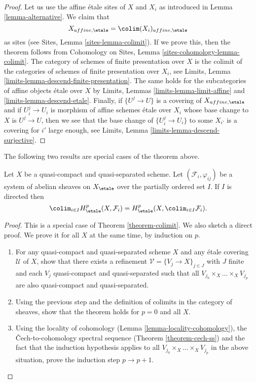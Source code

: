 \begin{proof}
Let us use the affine \'etale sites of $X$ and $X_i$ as introduced
in Lemma \ref{lemma-alternative}. We claim that
$$
X_{affine, \etale} = \colim (X_i)_{affine, \etale}
$$
as sites (see Sites, Lemma \ref{sites-lemma-colimit}).
If we prove this, then the theorem follows from
Cohomology on Sites, Lemma \ref{sites-cohomology-lemma-colimit}.
The category of schemes of finite presentation over $X$ is the
colimit of the categories of schemes of finite presentation over $X_i$, see
Limits, Lemma \ref{limits-lemma-descend-finite-presentation}.
The same holds for the subcategories of affine objects \'etale over
$X$ by Limits, Lemmas
\ref{limits-lemma-limit-affine} and \ref{limits-lemma-descend-etale}.
Finally, if $\{U^j \to U\}$ is a covering of $X_{affine, \etale}$
and if $U_i^j \to U_i$ is morphism of affine schemes \'etale over
$X_i$ whose base change to $X$ is $U^j \to U$, then we see that
the base change of $\{U^j_i \to U_i\}$ to some $X_{i'}$ is
a covering for $i'$ large enough, see
Limits, Lemma \ref{limits-lemma-descend-surjective}.
\end{proof}

\noindent
The following two results are special cases of the theorem above.

\begin{lemma}
\label{lemma-colimit}
Let $X$ be a quasi-compact and quasi-separated scheme. Let
$\left(\mathcal{F}_i, \varphi_{ij}\right)$ be a system of abelian sheaves on
$X_\etale$ over the partially ordered set $I$. If $I$ is directed then
$$
\colim_{i\in I} H_\etale^p(X, \mathcal{F}_i) = H_\etale^p(X,
\colim_{i\in I} \mathcal{F}_i).
$$
\end{lemma}

\begin{proof}
This is a special case of Theorem \ref{theorem-colimit}.
We also sketch a direct proof.
We prove it for all $X$ at the same time, by induction on $p$.
\begin{enumerate}
\item
For any quasi-compact and quasi-separated scheme $X$ and any \'etale covering
$\mathcal{U}$ of $X$, show that there exists a refinement
$\mathcal{V} = \{V_j \to X\}_{j\in J}$ with $J$ finite and each $V_j$
quasi-compact and quasi-separated such that all
$V_{j_0} \times_X \ldots \times_X V_{j_p}$ are also
quasi-compact and quasi-separated.
\item
Using the previous step and the definition of colimits in the category of
sheaves, show that the theorem holds for $p = 0$ and all $X$.
\item
Using the locality of cohomology
(Lemma \ref{lemma-locality-cohomology}),
the {\v C}ech-to-cohomology spectral sequence
(Theorem \ref{theorem-cech-ss}) and the fact that the induction
hypothesis applies to all
$V_{j_0} \times_X \ldots \times_X V_{j_p}$
in the above situation, prove the induction step $p \to p + 1$.
\end{enumerate}
\end{proof}

